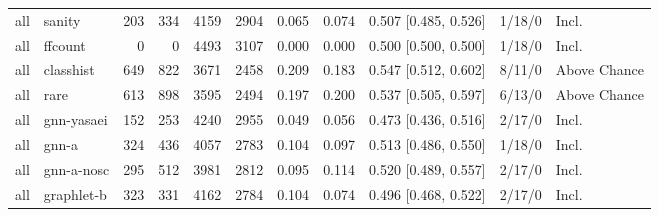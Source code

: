 \begin{tabular}{@{}llrrrrrrrll@{}}
all & sanity & 203 & 334 & 4159 & 2904 & 0.065 & 0.074 & 0.507 [0.485, 0.526] & 1/18/0 & Incl. \\
all & ffcount & 0 & 0 & 4493 & 3107 & 0.000 & 0.000 & 0.500 [0.500, 0.500] & 1/18/0 & Incl. \\
all & classhist & 649 & 822 & 3671 & 2458 & 0.209 & 0.183 & 0.547 [0.512, 0.602] & 8/11/0 & Above Chance \\
all & rare & 613 & 898 & 3595 & 2494 & 0.197 & 0.200 & 0.537 [0.505, 0.597] & 6/13/0 & Above Chance \\
all & gnn-yasaei & 152 & 253 & 4240 & 2955 & 0.049 & 0.056 & 0.473 [0.436, 0.516] & 2/17/0 & Incl. \\
all & gnn-a & 324 & 436 & 4057 & 2783 & 0.104 & 0.097 & 0.513 [0.486, 0.550] & 1/18/0 & Incl. \\
all & gnn-a-nosc & 295 & 512 & 3981 & 2812 & 0.095 & 0.114 & 0.520 [0.489, 0.557] & 2/17/0 & Incl. \\
all & graphlet-b & 323 & 331 & 4162 & 2784 & 0.104 & 0.074 & 0.496 [0.468, 0.522] & 2/17/0 & Incl. \\
\bottomrule
\end{tabular}
